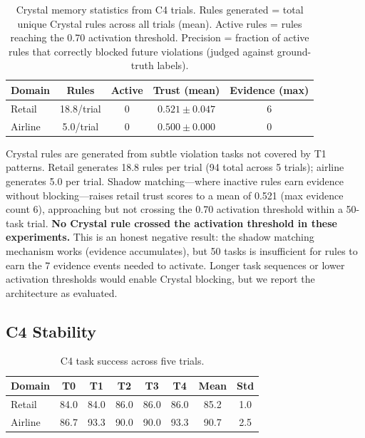 \documentclass[11pt]{article}
\begin{document}
\begin{table}[h]
\centering
\caption{Crystal memory statistics from C4 trials.
Rules generated = total unique Crystal rules across all trials (mean).
Active rules = rules reaching the 0.70 activation threshold.
Precision = fraction of active rules that correctly blocked future violations
(judged against ground-truth labels).}
\label{tab:crystal}
\small
\begin{tabular}{@{}lcccc@{}}
\toprule
Domain & Rules & Active & Trust (mean) & Evidence (max) \\
\midrule
Retail  & 18.8/trial & 0 & $0.521 \pm 0.047$ & 6 \\
Airline & 5.0/trial  & 0 & $0.500 \pm 0.000$ & 0 \\
\bottomrule
\end{tabular}
\end{table}

\noindent Crystal rules are generated from subtle violation tasks not covered
by T1 patterns. Retail generates 18.8 rules per trial (94 total across 5 trials);
airline generates 5.0 per trial.
Shadow matching---where inactive rules earn evidence without blocking---raises
retail trust scores to a mean of 0.521 (max evidence count 6), approaching
but not crossing the 0.70 activation threshold within a 50-task trial.
\textbf{No Crystal rule crossed the activation threshold in these experiments.}
This is an honest negative result: the shadow matching mechanism works
(evidence accumulates), but 50 tasks is insufficient for rules to
earn the 7 evidence events needed to activate.
Longer task sequences or lower activation thresholds would enable Crystal
blocking, but we report the architecture as evaluated.

\subsection{C4 Stability}

\begin{table}[h]
\centering
\caption{C4 task success across five trials.}
\label{tab:variance}
\small
\begin{tabular}{@{}lccccc cc@{}}
\toprule
Domain & T0 & T1 & T2 & T3 & T4 & Mean & Std \\
\midrule
Retail  & 84.0 & 84.0 & 86.0 & 86.0 & 86.0 & 85.2 & 1.0 \\
Airline & 86.7 & 93.3 & 90.0 & 90.0 & 93.3 & 90.7 & 2.5 \\
\bottomrule
\end{tabular}
\end{table}
\end{document}

